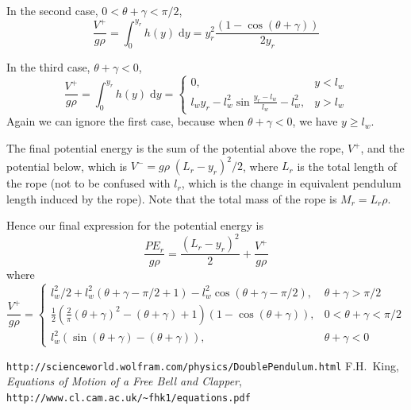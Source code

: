\documentclass{article}
\begin{document}
In the second case,  $0 < \theta+\gamma < \pi/2$,
\begin{equation}
\frac{V^+}{g\rho} = \int_0^{y_r} h(y) \; \mathrm{d}y = y_r^2 \frac{\left(1-\cos(\theta+\gamma)\right)}{2 y_r}
\end{equation}

In the third case,  $\theta+\gamma < 0$,
\begin{equation}
\frac{V^+}{g\rho} = \int_0^{y_r} h(y) \; \mathrm{d}y =   \left\{ \begin{array}{cl} 0, & y < l_w \\
l_w y_r - l_w^2 \sin \frac{y_r - l_w}{l_w} - l_w^2 , & y > l_w
\end{array} \right.
\end{equation}
Again we can ignore the first case, because when $\theta+\gamma < 0$, we have $y \geq l_w$.

The final potential energy is the sum of the potential above the rope, $V^+$, and the potential
below, which is $V^- = g \rho \; (L_r - y_r)^2/2$, where $L_r$ is the total length of the rope
(not to be confused with $l_r$, which is the change in equivalent pendulum length induced by the rope).
Note that the total mass of the rope is $M_r = L_r \rho$.

Hence our final expression for the potential energy is
\begin{equation}
\frac{PE_r}{g \rho} = \frac{(L_r - y_r)^2}{2} + \frac{V^+}{g \rho}
\end{equation}
where
\begin{equation}
 \frac{V^+}{g \rho} = \left\{
\begin{array}{cl}
l_w^2/2 + l_w^2 (\theta+\gamma-\pi/2+1) - l_w^2 \cos (\theta+\gamma-\pi/2), &
\theta + \gamma > \pi/2 \\

\frac{1}{2} \left(\frac{2}{\pi} (\theta+\gamma)^2 - (\theta+\gamma) + 1 \right) \left(1 - \cos(\theta+\gamma)\right), & 
0 < \theta+\gamma < \pi/2 \\

l_w^2 \left( \sin(\theta + \gamma) - (\theta+\gamma) \right), & \theta+\gamma < 0
\end{array}
\right.
\end{equation}


\begin{thebibliography}{99}
\texttt{http://scienceworld.wolfram.com/physics/DoublePendulum.html}
F.H.~King, \textit{Equations of Motion of a Free Bell and Clapper}, 
\texttt{http://www.cl.cam.ac.uk/\~{}fhk1/equations.pdf}
\end{thebibliography}
\end{document}
